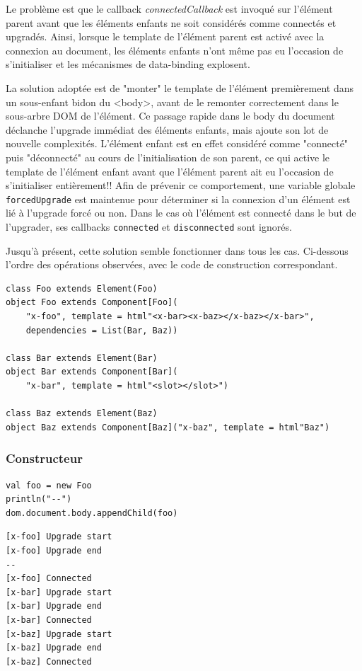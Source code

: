 Le problème est que le callback \emph{connectedCallback} est invoqué sur l'élément parent avant que les éléments enfants ne soit considérés comme connectés et upgradés. Ainsi, lorsque le template de l'élément parent est activé avec la connexion au document, les éléments enfants n'ont même pas eu l'occasion de s'initialiser et les mécanismes de data-binding explosent.

La solution adoptée est de "monter" le template de l'élément premièrement dans un sous-enfant bidon du <body>, avant de le remonter correctement dans le sous-arbre DOM de l'élément. Ce passage rapide dans le body du document déclanche l'upgrade immédiat des éléments enfants, mais ajoute son lot de nouvelle complexités. L'élément enfant est en effet considéré comme "connecté" puis "déconnecté" au cours de l'initialisation de son parent, ce qui active le template de l'élément enfant avant que l'élément parent ait eu l'occasion de s'initialiser entièrement!! Afin de prévenir ce comportement, une variable globale \texttt{forcedUpgrade} est maintenue pour déterminer si la connexion d'un élément est lié à l'upgrade forcé ou non. Dans le cas où l'élément est connecté dans le but de l'upgrader, ses callbacks \texttt{connected} et \texttt{disconnected} sont ignorés.

Jusqu'à présent, cette solution semble fonctionner dans tous les cas. Ci-dessous l'ordre des opérations observées, avec le code de construction correspondant.

\begin{lstlisting}
class Foo extends Element(Foo)
object Foo extends Component[Foo](
	"x-foo", template = html"<x-bar><x-baz></x-baz></x-bar>",
	dependencies = List(Bar, Baz))

class Bar extends Element(Bar)
object Bar extends Component[Bar](
	"x-bar", template = html"<slot></slot>")

class Baz extends Element(Baz)
object Baz extends Component[Baz]("x-baz", template = html"Baz")
\end{lstlisting}

\subsubsection{Constructeur}
\begin{lstlisting}
val foo = new Foo
println("--")
dom.document.body.appendChild(foo)
\end{lstlisting}

\begin{lstlisting}
[x-foo] Upgrade start
[x-foo] Upgrade end
--
[x-foo] Connected
[x-bar] Upgrade start
[x-bar] Upgrade end
[x-bar] Connected
[x-baz] Upgrade start
[x-baz] Upgrade end
[x-baz] Connected
\end{lstlisting}

